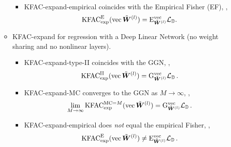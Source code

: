 \begin{itemize}
\begin{itemize}
\begin{itemize}
\begin{align*}
            \end{align*}
          \item KFAC-expand-empirical coincides with the Empirical Fisher (EF), \ie,
            \begin{align*}
              \mathrm{KFAC}^{\text{E}}_{\text{exp}}(\operatorname{vec}\tilde{{\bm{W}}}^{(l)}) = \mathrm{E}^{\operatorname{vec}}_{\tilde{{\bm{W}}}^{(l)}}{\mathcal{L}}_{{\mathbb{D}}}.
            \end{align*}
        \end{itemize}
      \item KFAC-expand for regression with a Deep Linear Network (no weight sharing and no nonlinear layers).
        \begin{itemize}
          \item KFAC-expand-type-II coincides with the GGN, \ie,
            \begin{align*}
              \mathrm{KFAC}^{\text{II}}_{\text{exp}}(\operatorname{vec} \tilde{{\bm{W}}}^{(l)}) = \mathrm{G}^{\operatorname{vec}}_{\tilde{{\bm{W}}}^{(l)}} {\mathcal{L}}_{{\mathbb{D}}}\,.
            \end{align*}
          \item KFAC-expand-MC converges to the GGN as $M\rightarrow\infty$, \ie, 
            \begin{align*}
              \lim_{M \to \infty} \mathrm{KFAC}^{\text{MC}=M}_{\text{exp}}(\operatorname{vec} \tilde{{\bm{W}}}^{(l)}) = \mathrm{G}^{\operatorname{vec}}_{\tilde{{\bm{W}}}^{(l)}} {\mathcal{L}}_{{\mathbb{D}}}\,.
            \end{align*}
          \item KFAC-expand-empirical does \emph{not} equal the empirical Fisher, \ie,
            \begin{align*}
              \mathrm{KFAC}_{\text{exp}}^{\text{E}}(\operatorname{vec} \tilde{{\bm{W}}}^{(l)})
              \neq
              \mathrm{E}^{\operatorname{vec}}_{\tilde{{\bm{W}}}^{(l)}} {\mathcal{L}}_{{\mathbb{D}}}\,.
            \end{align*}         
        \end{itemize}
      \end{itemize}
    \end{itemize}
